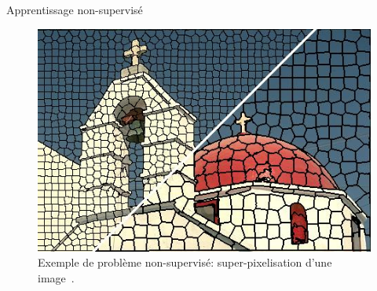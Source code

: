 \documentclass[8pt]{beamer}
\begin{document}
			\begin{frame}{Apprentissage non-supervisé}
				\begin{figure}[H]
					\begin{center}
						\includegraphics[height=.5\textheight]{images/samples/superpixels}
						\caption*{\tiny Exemple de problème non-supervisé: super-pixelisation d'une image~\cite{achanta2012slic}.}
					\end{center}
				\end{figure}
			\end{frame}
\end{document}
